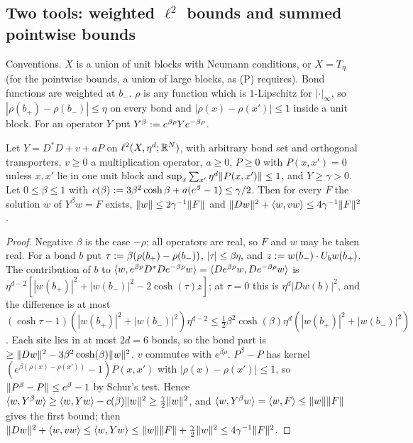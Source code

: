 
\subsection{Two tools: weighted $\ell^2$ bounds and summed pointwise bounds}\label{sup1:ssec:WK}

Conventions. $X$ is a union of unit blocks with Neumann conditions, or $X=T_\eta$ (for the pointwise bounds, a union of large blocks, as (P) requires). Bond functions are weighted at $b_-$. $\rho$ is any function which is $1$-Lipschitz for $|\cdot|_\infty$, so $|\rho(b_+)-\rho(b_-)|\le\eta$ on every bond and $|\rho(x)-\rho(x')|\le1$ inside a unit block. For an operator $Y$ put $Y^\beta:= e^{\beta\rho}Ye^{-\beta\rho}$.

\begin{lemma}\label{sup1:lem:W1}
Let $Y=D^*D+v+aP$ on $\ell^2(X,\eta^d;\mathbb R^N)$, with arbitrary bond set and orthogonal transporters, $v\ge0$ a multiplication operator, $a\ge0$, $P\ge0$ with $P(x,x')=0$ unless $x,x'$ lie in one unit block and $\sup_x\sum_{x'}\eta^d\lVert P(x,x')\rVert\le1$, and $Y\ge\gamma>0$. Let $0\le\beta\le1$ with $c(\beta):=3\beta^2\cosh\beta+a(e^\beta-1)\le\gamma/2$. Then for every $F$ the solution $w$ of $Y^\beta w=F$ exists, $\lVert w\rVert\le2\gamma^{-1}\lVert F\rVert$ and $\lVert Dw\rVert^2+\langle w,vw\rangle\le4\gamma^{-1}\lVert F\rVert^2$.
\end{lemma}

\begin{proof}
Negative $\beta$ is the case $-\rho$; all operators are real, so $F$ and $w$ may be taken real. For a bond $b$ put $\tau:=\beta(\rho(b_+)-\rho(b_-))$, $|\tau|\le\beta\eta$, and $z:= w(b_-)\cdot U_bw(b_+)$. The contribution of $b$ to $\langle w,e^{\beta\rho}D^*De^{-\beta\rho}w\rangle=\langle De^{\beta\rho}w,De^{-\beta\rho}w\rangle$ is $\eta^{d-2}[|w(b_+)|^2+|w(b_-)|^2-2\cosh(\tau)z]$; at $\tau=0$ this is $\eta^d|Dw(b)|^2$, and the difference is at most $(\cosh\tau-1)(|w(b_+)|^2+|w(b_-)|^2)\eta^{d-2}\le\frac12\beta^2\cosh(\beta)\eta^d(|w(b_+)|^2+|w(b_-)|^2)$. Each site lies in at most $2d=6$ bonds, so the bond part is $\ge\lVert Dw\rVert^2-3\beta^2\cosh(\beta)\lVert w\rVert^2$. $v$ commutes with $e^{\beta\rho}$. $P^\beta-P$ has kernel $(e^{\beta(\rho(x)-\rho(x'))}-1)P(x,x')$ with $|\rho(x)-\rho(x')|\le1$, so $\lVert P^\beta-P\rVert\le e^\beta-1$ by Schur's test. Hence $\langle w,Y^\beta w\rangle\ge\langle w,Yw\rangle-c(\beta)\lVert w\rVert^2\ge\frac\gamma2\lVert w\rVert^2$, and $\langle w,Y^\beta w\rangle=\langle w,F\rangle\le\lVert w\rVert\lVert F\rVert$ gives the first bound; then $\lVert Dw\rVert^2+\langle w,vw\rangle\le\langle w,Yw\rangle\le\lVert w\rVert\lVert F\rVert+\frac\gamma2\lVert w\rVert^2\le4\gamma^{-1}\lVert F\rVert^2$.
\end{proof}

